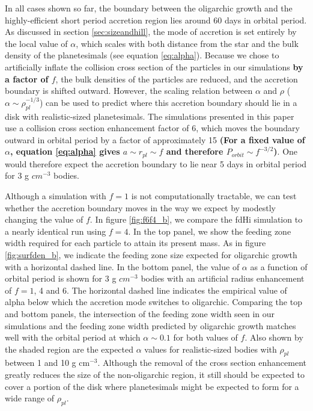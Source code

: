 \documentclass[twocolumn,linenumbers]{aastex63}
\begin{document}
In all cases shown so far, the boundary between the
oligarchic growth and the highly-efficient short period accretion
region lies around 60 days in orbital period. As discussed in section \ref{sec:sizeandhill}, the mode of accretion is
set entirely by the local value of $\alpha$, which scales with both
distance from the star and the bulk density of the planetesimals (see
equation \ref{eq:alpha}). Because we chose to artificially inflate the
collision cross section of the particles in our simulations \textbf{by a factor of $f$}, the bulk densities
of the particles are reduced, and the accretion boundary is shifted outward.
However, the scaling relation between $\alpha$ and $\rho$ ($\alpha \sim \rho_{pl}^{-1/3}$) can be used
to predict where this accretion boundary should lie in a disk with realistic-sized planetesimals. The simulations
presented in this paper use a collision cross section enhancement factor of 6, which moves the boundary outward in orbital
period by a factor of approximately 15 \textbf{(For a fixed value of $\alpha$, equation \ref{eq:alpha} gives $a \sim r_{pl} \sim f$ and therefore $P_{orbit} \sim f^{-3/2}$)}. One would therefore expect the accretion boundary to lie near 5 days in orbital period
for 3 g $cm^{-3}$ bodies.

Although a simulation with $f=1$ is not computationally tractable, we
can test whether the accretion boundary moves in the way we expect by
modestly changing the value of $f$. In figure \ref{fig:f6f4_b}, we
compare the fdHi simulation to a nearly identical run using $f=4$. In
the top panel, we show the feeding zone width required for each particle to
attain its present mass. As in figure \ref{fig:surfden_b}, we indicate the feeding
zone size expected for oligarchic growth with a horizontal dashed line. In the bottom panel, the value
of $\alpha$ as a function of orbital period is shown for 3 g $cm^{-3}$
bodies with an artificial radius enhancement of $f=1$, 4 and 6. The
horizontal dashed line indicates the empirical value of alpha below which the
accretion mode switches to oligarchic. Comparing the top and
bottom panels, the intersection of the feeding zone width seen in our simulations and the
feeding zone width predicted by oligarchic growth matches well with the orbital period at which $\alpha
\sim 0.1$ for both values of $f$.  Also shown by the shaded region are the expected $\alpha$ values for
realistic-sized bodies with $\rho_{pl}$ between 1 and 10 g cm$^{-3}$. Although the removal of the cross section
enhancement greatly reduces the size of the non-oligarchic region, it still should be expected to cover a portion of the
disk where planetesimals might be expected to form for a wide range of $\rho_{pl}$.
\end{document}
